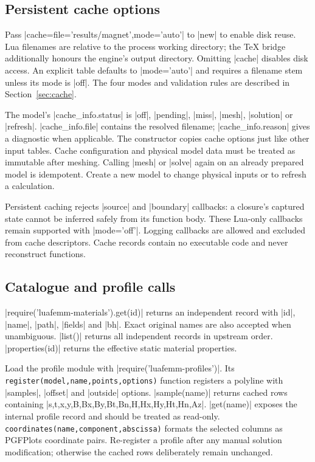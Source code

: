 \subsection{Persistent cache options}
Pass |cache={file='results/magnet',mode='auto'}| to |new| to enable disk
reuse. Lua filenames are relative to the process working directory; the
TeX bridge additionally honours the engine's output directory.
Omitting |cache| disables disk access. An explicit table defaults to
|mode='auto'| and requires a filename stem unless its mode is |off|.
The four modes and validation rules are described in Section~\ref{sec:cache}.

The model's |cache_info.status| is |off|, |pending|, |miss|, |mesh|,
|solution| or |refresh|. |cache_info.file| contains the resolved filename;
|cache_info.reason| gives a diagnostic when applicable. The constructor
copies cache options just like other input tables. Cache configuration
and physical model data must be treated as immutable after meshing.
Calling |mesh| or |solve| again on an already prepared model is idempotent.
Create a new model to change physical inputs or to refresh a calculation.

Persistent caching rejects |source| and |boundary| callbacks: a closure's
captured state cannot be inferred safely from its function body. These
Lua-only callbacks remain supported with |mode='off'|. Logging callbacks
are allowed and excluded from cache descriptors. Cache records contain
no executable code and never reconstruct functions.

\subsection{Catalogue and profile calls}
|require('luafemm-materials').get(id)| returns an independent record with
|id|, |name|, |path|, |fields| and |bh|. Exact original names are also accepted
when unambiguous. |list()| returns all independent records in upstream
order. |properties(id)| returns the effective static material properties.

Load the profile module with |require('luafemm-profiles')|. Its
\nolinkurl{register(model,name,points,options)} function registers a polyline with |samples|,
|offset| and |outside| options. |sample(name)| returns cached rows containing
|s,t,x,y,B,Bx,By,Bt,Bn,H,Hx,Hy,Ht,Hn,Az|. |get(name)| exposes the internal
profile record and should be treated as read-only. \nolinkurl{coordinates(name,component,abscissa)}
formats the selected columns as PGFPlots coordinate pairs. Re-register
a profile after any manual solution modification; otherwise the cached
rows deliberately remain unchanged.

